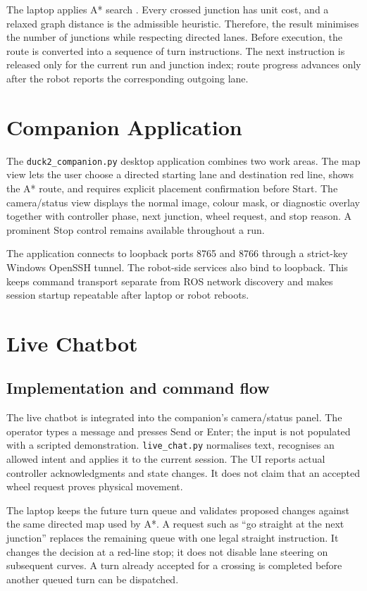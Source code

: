 \documentclass[10pt,a4paper,twocolumn]{article}
\newcommand{\code}[1]{\texttt{#1}}
\begin{document}
The laptop applies A* search \cite{hart1968astar}. Every crossed junction has
unit cost, and a relaxed graph distance is the admissible heuristic. Therefore,
the result minimises the number of junctions while respecting directed lanes.
Before execution, the route is converted into a sequence of turn instructions.
The next instruction is released only for the current run and junction index;
route progress advances only after the robot reports the corresponding outgoing
lane.

\section{Companion Application}

The \code{duck2\_companion.py} desktop application combines two work areas. The
map view lets the user choose a directed starting lane and destination red line,
shows the A* route, and requires explicit placement confirmation before Start.
The camera/status view displays the normal image, colour mask, or diagnostic
overlay together with controller phase, next junction, wheel request, and stop
reason. A prominent Stop control remains available throughout a run.

The application connects to loopback ports 8765 and 8766 through a strict-key
Windows OpenSSH tunnel. The robot-side services also bind to loopback. This
keeps command transport separate from ROS network discovery and makes session
startup repeatable after laptop or robot reboots.


\section{Live Chatbot}

\subsection{Implementation and command flow}

The live chatbot is integrated into the companion's camera/status panel. The
operator types a message and presses Send or Enter; the input is not populated
with a scripted demonstration. \code{live\_chat.py} normalises text, recognises
an allowed intent and applies it to the current session. The UI reports actual
controller acknowledgments and state changes. It does not claim that an
accepted wheel request proves physical movement.

The laptop keeps the future turn queue and validates proposed changes against
the same directed map used by A*. A request such as ``go straight at the next
junction'' replaces the remaining queue with one legal straight instruction.
It changes the decision at a red-line stop; it does not disable lane steering
on subsequent curves. A turn already accepted for a crossing is completed
before another queued turn can be dispatched.
\end{document}
